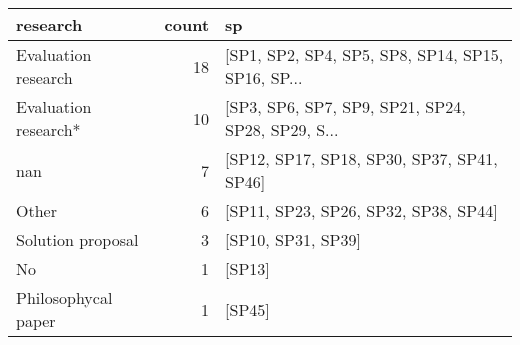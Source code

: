 \begin{tabular}{lrl}
\toprule
             research &  count &                                                 sp \\
\midrule
  Evaluation research &     18 &  [SP1, SP2, SP4, SP5, SP8, SP14, SP15, SP16, SP... \\
 Evaluation research* &     10 &  [SP3, SP6, SP7, SP9, SP21, SP24, SP28, SP29, S... \\
                  nan &      7 &         [SP12, SP17, SP18, SP30, SP37, SP41, SP46] \\
                Other &      6 &               [SP11, SP23, SP26, SP32, SP38, SP44] \\
    Solution proposal &      3 &                                 [SP10, SP31, SP39] \\
                   No &      1 &                                             [SP13] \\
  Philosophycal paper &      1 &                                             [SP45] \\
\bottomrule
\end{tabular}
